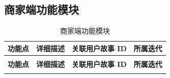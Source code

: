 \subsection{商家端功能模块}
\begin{longtable}{>{\centering\arraybackslash}m{3cm} >{\centering\arraybackslash}m{6.5cm} >{\centering\arraybackslash}m{2cm} >{\centering\arraybackslash}m{2cm}}

    \caption{商家端功能模块} \label{tab:training}                                                                              \\

    \toprule
    \textbf{功能点}      & \textbf{详细描述}                                              & \textbf{关联用户故事 ID} & \textbf{所属迭代} \\
    \midrule
    \endfirsthead

    \multicolumn{4}{c}{{\tablename\ \thetable{} 续表}}                                                                    \\
    \toprule
    \textbf{功能点}      & \textbf{详细描述}                                              & \textbf{关联用户故事 ID} & \textbf{所属迭代} \\
    \midrule
    \endhead

    \bottomrule
    \endfoot



\end{longtable}
